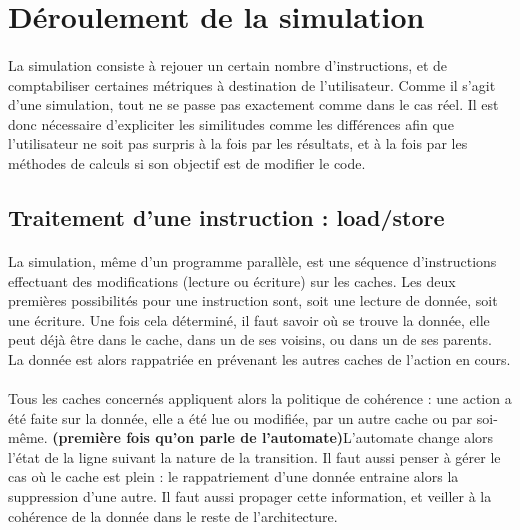 \section{Déroulement de la simulation}

\paragraph{}
La simulation consiste à rejouer un certain nombre d'instructions, et de comptabiliser certaines métriques à destination de l'utilisateur. Comme il s'agit d'une simulation, tout ne se passe pas exactement comme dans le cas réel. Il est donc nécessaire d'expliciter les similitudes comme les différences afin que l'utilisateur ne soit pas surpris à la fois par les résultats, et à la fois par les méthodes de calculs si son objectif est de modifier le code.

\subsection{Traitement d'une instruction : load/store}

\paragraph{}
La simulation, même d'un programme parallèle, est une séquence d'instructions effectuant des modifications (lecture ou écriture) sur les caches. Les deux premières possibilités pour une instruction sont, soit une lecture de donnée, soit une écriture. Une fois cela déterminé, il faut savoir où se trouve la donnée, elle peut déjà être dans le cache, dans un de ses voisins, ou dans un de ses parents. La donnée est alors rappatriée en prévenant les autres caches de l'action en cours. 

\paragraph{}
Tous les caches concernés appliquent alors la politique de cohérence : une action a été faite sur la donnée, elle a été lue ou modifiée, par un autre cache ou par soi-même. \textbf{(première fois qu'on parle de l'automate)}L'automate change alors l'état de la ligne suivant la nature de la transition. Il faut aussi penser à gérer le cas où le cache est plein : le rappatriement d'une donnée entraine alors la suppression d'une autre. Il faut aussi propager cette information, et veiller à la cohérence de la donnée dans le reste de l'architecture.

